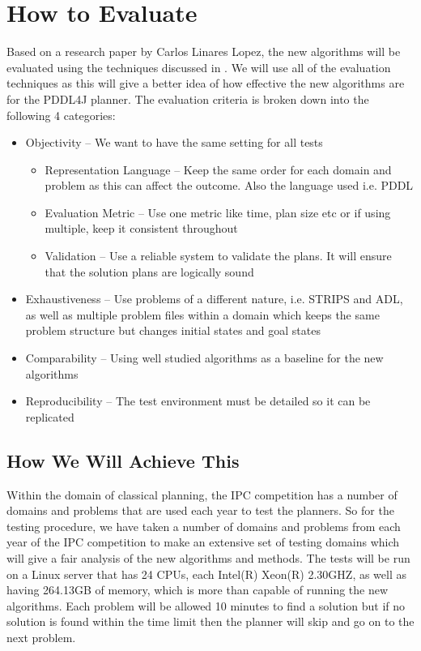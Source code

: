 \section{How to Evaluate}
Based on a research paper by Carlos Linares Lopez, the new algorithms will be evaluated using the techniques discussed in \cite{Evaluation}. We will use all of the evaluation techniques as this will give a better idea of how effective the new algorithms are for the PDDL4J planner. 
The evaluation criteria is broken down into the following 4 categories:
\begin{itemize}
\item Objectivity – We want to have the same setting for all tests
\begin{itemize}
\item Representation Language – Keep the same order for each domain and problem as this can affect the outcome. Also the language used i.e. PDDL 
\item Evaluation Metric – Use one metric like time, plan size etc or if using multiple, keep it consistent throughout
\item Validation – Use a reliable system to validate the plans. It will ensure that the solution plans are logically sound 
\end{itemize}
\item Exhaustiveness – Use problems of a different nature, i.e. STRIPS and ADL, as well as multiple problem files within a domain which keeps the same problem structure but changes initial states and goal states
\item Comparability – Using well studied algorithms as a baseline for the new algorithms
\item Reproducibility – The test environment must be detailed so it can be replicated  
\end{itemize}
\subsection{How We Will Achieve This}
Within the domain of classical planning, the IPC competition has a number of domains and problems that are used each year to test the planners. So for the testing procedure, we have taken a number of domains and problems from each year of the IPC competition to make an extensive set of testing domains which will give a fair analysis of the new algorithms and methods. The tests will be run on a Linux server that has 24 CPUs, each Intel(R) Xeon(R) 2.30GHZ, as well as having 264.13GB of memory, which is more than capable of running the new algorithms. Each problem will be allowed 10 minutes to find a solution but if no solution is found within the time limit then the planner will skip and go on to the next problem. 

